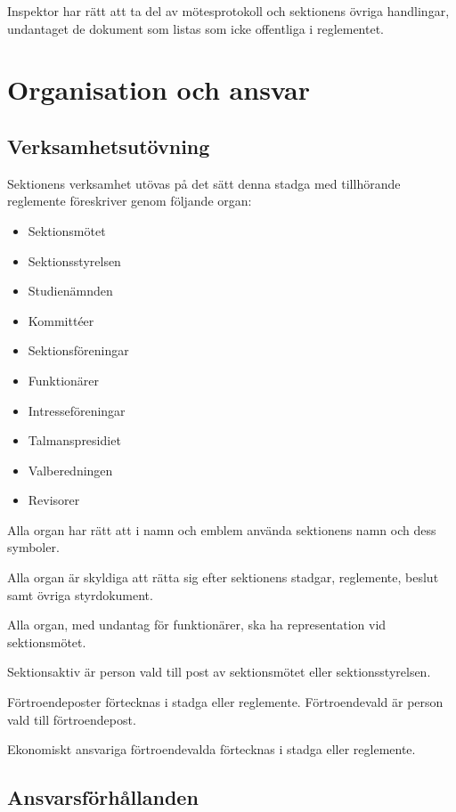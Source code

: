 \documentclass{styrdokument}
\begin{document}
\? Inspektor har rätt att ta del av mötesprotokoll och sektionens övriga handlingar, undantaget de dokument som listas som icke offentliga i reglementet.

\section{Organisation och ansvar}

\subsection{Verksamhetsutövning}

\? Sektionens verksamhet utövas på det sätt denna stadga med tillhörande reglemente föreskriver genom följande organ:
\begin{itemize}
    \item Sektionsmötet
    \item Sektionsstyrelsen
    \item Studienämnden
    \item Kommittéer
    \item Sektionsföreningar
    \item Funktionärer
    \item Intresseföreningar
    \item Talmanspresidiet
    \item Valberedningen
    \item Revisorer
\end{itemize}

\? Alla organ har rätt att i namn och emblem använda sektionens namn och dess symboler.

\? Alla organ är skyldiga att rätta sig efter sektionens stadgar, reglemente, beslut samt övriga styrdokument.

\? Alla organ, med undantag för funktionärer, ska ha representation vid sektionsmötet.

\? Sektionsaktiv är person vald till post av sektionsmötet eller sektionsstyrelsen.

\? Förtroendeposter förtecknas i stadga eller reglemente.
Förtroendevald är person vald till förtroendepost.

\? Ekonomiskt ansvariga förtroendevalda förtecknas i stadga eller reglemente.

\subsection{Ansvarsförhållanden} \label{ansvar}
\end{document}
